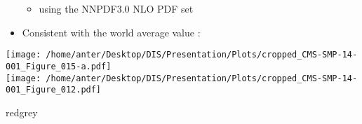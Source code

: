 \documentclass{beamer}
\begin{document}
\begin{frame}
\begin{minipage}[thbp]{0.7\textwidth}
\begin{itemize}
\vspace{1mm}
\begin{itemize}
\tri
\item {\footnotesize using the NNPDF3.0 NLO PDF set \\}
\end{itemize}
\vspace{-1mm}
\item {\footnotesize Consistent with the world average value : \\} \vspace{1mm}
\end{itemize}
\ball
\end{minipage}
\hspace*{-6mm}
\begin{minipage}[thbp]{0.08\textwidth}
\hspace*{0mm}\texttt{[image: /home/anter/Desktop/DIS/Presentation/Plots/cropped\_CMS-SMP-14-001\_Figure\_015-a.pdf]}\\
\hspace*{3mm}\texttt{[image: /home/anter/Desktop/DIS/Presentation/Plots/cropped\_CMS-SMP-14-001\_Figure\_012.pdf]}\\
\hspace*{12mm}\begin{beamercolorbox}[wd=23mm,ht=1mm,center,shadow=true, rounded=true]{redgrey}
{}
{\scalebox {0.61} {}}
\end{beamercolorbox}
\end{minipage}
\end{frame}
\end{document}
